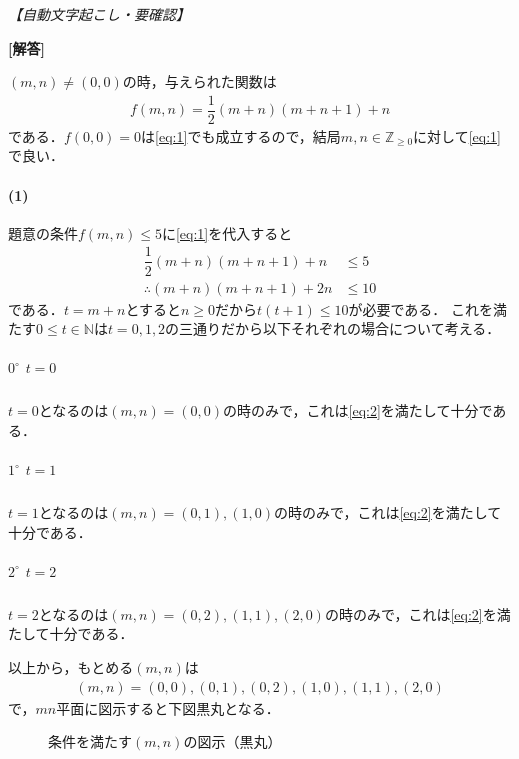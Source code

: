 \documentclass[../../main.tex]{subfiles}
\begin{document}
\begin{oframed}
  
\end{oframed}

\begin{flushright}
  \footnotesize\textit{【自動文字起こし・要確認】}
\end{flushright}

{\bf [解答]}

$(m,n)\neq (0,0)$の時，与えられた関数は
\begin{align}
  f(m,n)=\dfrac{1}{2}(m+n)(m+n+1)+n \label{eq:1}
\end{align}
である．$f(0,0)=0$は\cref{eq:1}でも成立するので，結局$m,n\in\mathbb{Z}_{\ge0}$に対して\cref{eq:1}で良い．

\paragraph{(1)}

題意の条件$f(m,n) \le 5$に\cref{eq:1}を代入すると
\begin{align}
  \dfrac{1}{2}(m+n)(m+n+1)+n&\le5 \\
  \therefore
  (m+n)(m+n+1)+2n&\le 10 \label{eq:2}
\end{align}
である．$t=m+n$とすると$n\ge 0$だから$t(t+1)\le10$が必要である．
これを満たす$0 \le t\in\mathbb{N}$は$t=0,1,2$の三通りだから以下それぞれの場合について考える．

\subparagraph{$0^{\circ}$ $t=0$}

$t=0$となるのは$(m,n)=(0,0)$の時のみで，これは\cref{eq:2}を満たして十分である．

\subparagraph{$1^\circ$ $t=1$}

$t=1$となるのは$(m,n)=(0,1),(1,0)$の時のみで，これは\cref{eq:2}を満たして十分である．

\subparagraph{$2^\circ$ $t=2$}

$t=2$となるのは$(m,n)=(0,2),(1,1),(2,0)$の時のみで，これは\cref{eq:2}を満たして十分である．
\casesend

以上から，もとめる$(m,n)$は
\begin{align}
  (m,n)=(0,0),(0,1),(0,2),(1,0),(1,1),(2,0)
\end{align}
で，$mn$平面に図示すると下図黒丸となる．

\begin{figure}[htb]
  \begin{center}
  \end{center}
  \caption{条件を満たす$(m,n)$の図示（黒丸）}
\end{figure}
\end{document}
